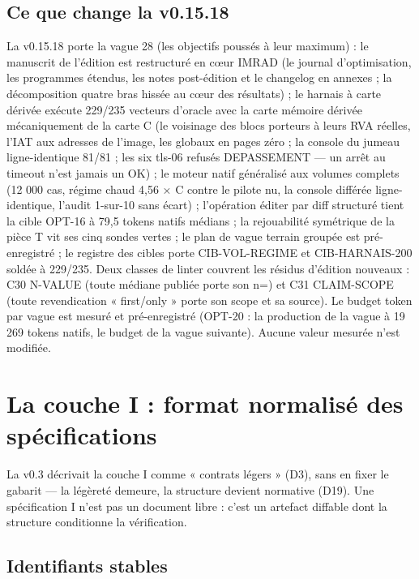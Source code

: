 \subsection{Ce que change la v0.15.18}\label{sec:nouveautes1518}

La v0.15.18 porte la vague 28 (les objectifs poussés à leur maximum) : le manuscrit
de l'édition est restructuré en cœur IMRAD (le journal d'optimisation, les programmes
étendus, les notes post-édition et le changelog en annexes ; la décomposition quatre
bras hissée au cœur des résultats) ; le harnais à carte dérivée exécute 229/235
vecteurs d'oracle avec la carte mémoire dérivée mécaniquement de la carte C (le
voisinage des blocs porteurs à leurs RVA réelles, l'IAT aux adresses de l'image, les
globaux en pages zéro ; la console du jumeau ligne-identique 81/81 ; les six tls-06
refusés DEPASSEMENT — un arrêt au timeout n'est jamais un OK) ; le moteur natif
généralisé aux volumes complets (12 000 cas, régime chaud 4,56 × C contre le pilote
nu, la console différée ligne-identique, l'audit 1-sur-10 sans écart) ; l'opération
éditer par diff structuré tient la cible OPT-16 à 79,5 tokens natifs médians ; la
rejouabilité symétrique de la pièce T vit ses cinq sondes vertes ; le plan de vague
terrain groupée est pré-enregistré ; le registre des cibles porte CIB-VOL-REGIME et
CIB-HARNAIS-200 soldée à 229/235. Deux classes de linter couvrent les résidus
d'édition nouveaux : C30 N-VALUE (toute médiane publiée porte son n=) et
C31 CLAIM-SCOPE (toute revendication « first/only » porte son scope et sa source).
Le budget token par vague est mesuré et pré-enregistré (OPT-20 : la production de
la vague à 19 269 tokens natifs, le budget de la vague suivante). Aucune valeur
mesurée n'est modifiée.

\section{La couche I : format normalisé des spécifications}\label{sec:coucheI}

La v0.3 décrivait la couche I comme « contrats légers » (D3), sans en fixer le gabarit —
la légèreté demeure, la structure devient normative (D19). Une spécification I n’est pas un
document libre : c’est un artefact diffable dont la structure conditionne la vérification.

\subsection{Identifiants stables}

